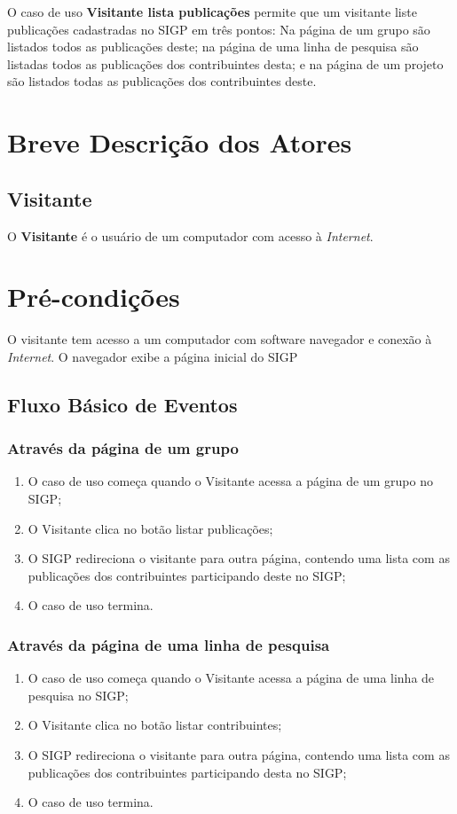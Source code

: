 \documentclass[11pt, a4paper,oneside]{book}
\begin{document}
O caso de uso \textbf{Visitante lista publicações} permite que um visitante liste publicações cadastradas no SIGP em três pontos: Na página de um grupo são listados todos as publicações deste; na página de uma linha de pesquisa são listadas todos as publicações dos contribuintes desta; e na página de um projeto são listados todas as publicações dos contribuintes deste.

\section{Breve Descrição dos Atores}

\subsection{Visitante}

O \textbf{Visitante} é o usuário de um computador com acesso à \emph{Internet}.

\section{Pré-condições}
O visitante tem acesso a um computador com software navegador e conexão à \emph{Internet}.
O navegador exibe a página inicial do SIGP

\subsection{Fluxo Básico de Eventos}

\subsubsection{Através da página de um grupo}
\begin{enumerate}
\item O caso de uso começa quando o Visitante acessa a página de um grupo no SIGP;
\item O Visitante clica no botão listar publicações;
\item O SIGP redireciona o visitante para outra página, contendo uma lista com as publicações dos contribuintes participando deste no SIGP;
\item O caso de uso termina.
\end{enumerate}

\subsubsection{Através da página de uma linha de pesquisa}
\begin{enumerate}
\item O caso de uso começa quando o Visitante acessa a página de uma linha de pesquisa no SIGP;
\item O Visitante clica no botão listar contribuintes;
\item O SIGP redireciona o visitante para outra página, contendo uma lista com as publicações dos contribuintes participando desta no SIGP;
\item O caso de uso termina.
\end{enumerate}
\end{document}
